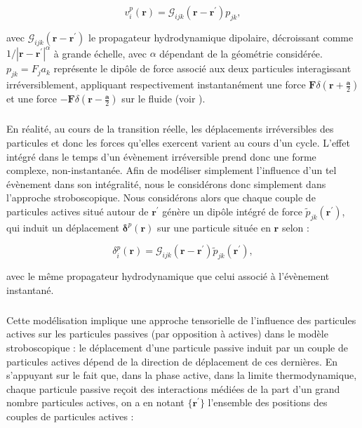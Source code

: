 \begin{equation}
	v^p_i(\mathbf{r}) = \mathcal{G}_{ijk}(\mathbf{r}-\mathbf{r}^\prime)p_{jk},
\end{equation}

\noindent avec $\mathcal{G}_{ijk}(\mathbf{r}-\mathbf{r}^\prime)$ le propagateur hydrodynamique dipolaire, décroissant comme $1/|\mathbf{r}-\mathbf{r}^\prime|^\alpha$ à grande échelle, avec $\alpha$ dépendant de la géométrie considérée. $p_{jk} = F_j a_k$ représente le dipôle de force associé aux deux particules interagissant irréversiblement, appliquant respectivement instantanément une force $\mathbf{F}\delta(\mathbf{r}+\frac{\mathbf{a}}{2})$ et une force $-\mathbf{F}\delta(\mathbf{r}-\frac{\mathbf{a}}{2})$ sur le fluide (voir ).

\subparagraph{}En réalité, au cours de la transition réelle, les déplacements irréversibles des particules et donc les forces qu'elles exercent varient au cours d'un cycle. L'effet intégré dans le temps d'un évènement irréversible prend donc une forme complexe, non-instantanée. Afin de modéliser simplement l'influence d'un tel évènement dans son intégralité, nous le considérons donc simplement dans l'approche stroboscopique. Nous considérons alors que chaque couple de particules actives situé autour de $\mathbf{r}^\prime$ génère un dipôle intégré de force $\tilde{p}_{jk}(\mathbf{r}^\prime)$, qui induit un déplacement $\boldsymbol\delta^p(\mathbf{r})$ sur une particule située en $\mathbf{r}$ selon :

\begin{equation}
	\delta^p_i(\mathbf{r}) = \mathcal{G}_{ijk}(\mathbf{r}-\mathbf{r}^\prime)\tilde{p}_{jk}(\mathbf{r}^\prime),
\end{equation}

\noindent avec le même propagateur hydrodynamique que celui associé à l'évènement instantané.

\subparagraph{}Cette modélisation implique une approche tensorielle de l'influence des particules actives sur les particules passives (par opposition à actives) dans le modèle stroboscopique : le déplacement d'une particule passive induit par un couple de particules actives dépend de la direction de déplacement de ces dernières. En s'appuyant sur le fait que, dans la phase active, dans la limite thermodynamique, chaque particule passive reçoit des interactions médiées de la part d'un grand nombre particules actives, on a en notant $\{ \mathbf{r}^\prime \}$ l'ensemble des positions des couples de particules actives :

